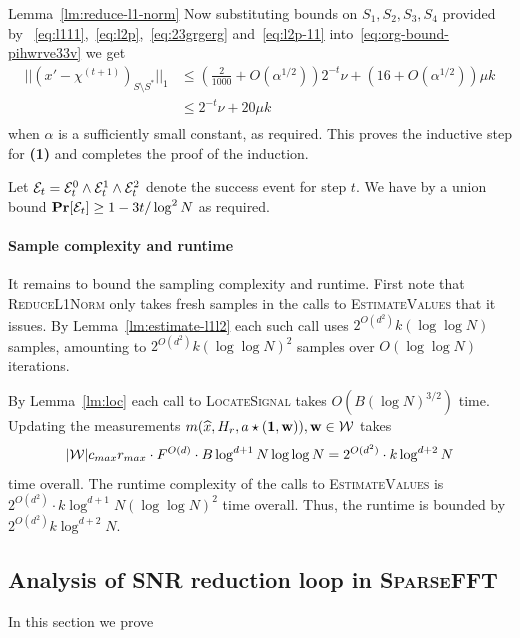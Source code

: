 \begin{proofof}{Lemma~\ref{lm:reduce-l1-norm}}
Now substituting bounds on $S_1, S_2, S_3, S_4$ provided by ~\eqref{eq:l111},~\eqref{eq:l2p},~\eqref{eq:23grgerg} and~\eqref{eq:l2p-11} into~\eqref{eq:org-bound-pihwrve33v} we get
\begin{equation*}
\begin{split}
||(x'-\chi^{(t+1)})_{S\setminus S^*}||_1&\leq (\frac2{1000}+O(\alpha^{1/2})) 2^{-t}\nu+(16+O(\alpha^{1/2}))\mu k\\
&\leq 2^{-t}\nu+20\mu k\\
\end{split}
\end{equation*}
when $\alpha$ is a sufficiently small constant, as required. This proves the inductive step for {\bf (1)} and completes the proof of the induction.

Let ${\mathcal{E}}_t={\mathcal{E}}^0_t\wedge {\mathcal{E}}^1_t \wedge {\mathcal{E}}^2_t$ denote the success event for step $t$. We have by a union bound ${\bf \mbox{\bf Pr}}[{\mathcal{E}}_t]\geq 1-3t/\log^2 N$ as required.


\paragraph{Sample complexity and runtime} It remains to bound the sampling complexity and runtime. First note that \textsc{ReduceL1Norm} only takes fresh samples in the calls to \textsc{EstimateValues} that it issues.
By Lemma~\ref{lm:estimate-l1l2} each such call uses $2^{O(d^2)} k(\log\log N)$ samples, amounting to $2^{O(d^2)} k(\log\log N)^2$ samples over $O(\log\log N)$ iterations. 

By Lemma~\ref{lm:loc} each call to \textsc{LocateSignal} takes $O(B(\log N)^{3/2})$ time.  Updating the measurements $m(\widehat{x}, H_r, a\star (\mathbf{1}, \mathbf{w})), \mathbf{w}\in \mathcal{W}$ takes 
$$
|\mathcal{W}|c_{max} r_{max}\cdot F^{O(d)}\cdot B \log^{d+1} N \log\log N=2^{O(d^2)}\cdot k\log^{d+2} N
$$ time overall.
The runtime complexity of the calls to \textsc{EstimateValues} is $2^{O(d^2)}\cdot k \log^{d+1} N(\log\log N)^2$ time overall.
Thus, the runtime is bounded by $2^{O(d^2)}k \log^{d+2} N$.
\end{proofof}


\subsection{Analysis of SNR reduction loop in \textsc{SparseFFT}}\label{sec:snr-loop}
In this section we prove

